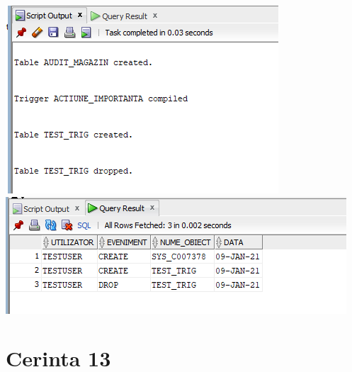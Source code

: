 \documentclass{article}
\begin{document}
\vspace{0.5cm}

\includegraphics[width=\textwidth]{12-4.png}
\includegraphics[width=\textwidth]{12-3.png}

\newpage
\section{Cerinta 13}
\end{document}
